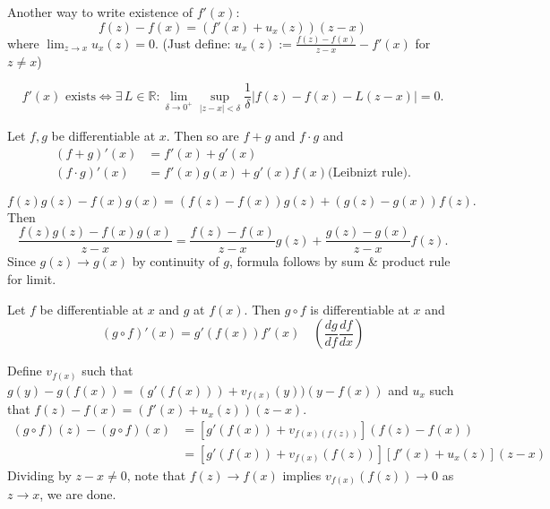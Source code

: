 \documentclass{notes}
\begin{document}
  Another way to write existence of $f'(x)$: 
  \[
    f(z) - f(x) = (f'(x) + u_x(z)) (z - x)
  \]
  where $\lim_{z \to x} u_x(z) = 0$.
  (Just define: $u_x(z) := \frac{f(z) - f(x)}{z - x} - f'(x)$ for $z \neq x$)
  
  \begin{lem}
    \[
      \text{$f'(x)$ exists} \Leftrightarrow \exists \, L \in \mathbb R: \lim_{\delta \to 0^+} \sup_{\left | z - x \right | < \delta} \frac{1}{\delta} \left | f(z) - f(x) - L (z - x) \right | = 0.
    \]
  \end{lem}
  
  \begin{lem}
    Let $f, g$ be differentiable at $x$.
    Then so are $f + g$ and $f \cdot g$ and 
    \begin{align*}
      (f + g)'(x) &= f'(x) + g'(x) \\ 
      (f \cdot g)'(x) &= f'(x) g(x) + g'(x) f(x) \text{(Leibnizt rule)}.
    \end{align*}
  \end{lem}
  
  \begin{prf}
    \[
      f(z) g(z) - f(x) g(x) = (f(z) - f(x)) g(z) + (g(z) - g(x)) f(z).
    \]
    Then 
    \[
      \frac{f(z) g(z) - f(x) g(x)}{z - x} = \frac{f(z) - f(x)}{z - x} g(z) + \frac{g(z) - g(x)}{z - x} f(z).
    \]
    Since $g(z) \to g(x)$ by continuity of $g$, formula follows by sum \& product rule for limit.
  \end{prf}
  
  \begin{lem}
    Let $f$ be differentiable at $x$ and $g$ at $f(x)$.
    Then $g \circ f$ is differentiable at $x$ and 
    \[
      (g \circ f)'(x) = g'(f(x)) f'(x) \quad \left ( \frac{dg}{df} \frac{df}{dx} \right )
    \]
  \end{lem}
  
  \newpage
  
  \begin{prf}
    Define $v_{f(x)}$ such that $g(y) - g(f(x)) = (g'(f(x))) + v_{f(x)}(y)) (y  - f(x))$ and $u_x$ such that $f(z) - f(x) = (f'(x) + u_x(z)) (z - x)$.
    \begin{align*}
      (g \circ f)(z) - (g \circ f)(x) &= [g'(f(x)) + v_{f(x)(f(z))}] (f(z) - f(x)) \\ 
      &= [g'(f(x)) + v_{f(x)}(f(z))] [f'(x) + u_x(z)] (z - x)
    \end{align*}
    Dividing by $z - x \neq 0$, note that $f(z) \to f(x)$ implies $v_{f(x)}(f(z)) \to 0$ as $z \to x$, we are done.
  \end{prf}
  
\end{document}
